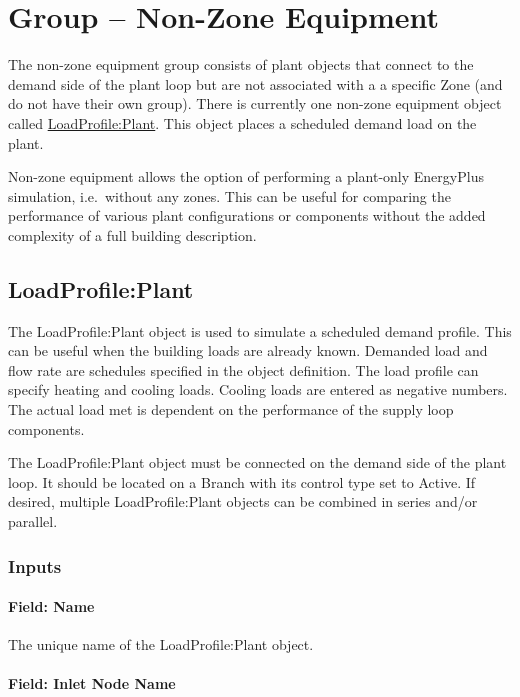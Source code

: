 \section{Group -- Non-Zone Equipment}\label{group-non-zone-equipment}

The non-zone equipment group consists of plant objects that connect to the demand side of the plant loop but are not associated with a a specific Zone (and do not have their own group). There is currently one non-zone equipment object called \hyperref[loadprofileplant]{LoadProfile:Plant}. This object places a scheduled demand load on the plant.

Non-zone equipment allows the option of performing a plant-only EnergyPlus simulation, i.e.~without any zones. This can be useful for comparing the performance of various plant configurations or components without the added complexity of a full building description.

\subsection{LoadProfile:Plant}\label{loadprofileplant}

The LoadProfile:Plant object is used to simulate a scheduled demand profile. This can be useful when the building loads are already known. Demanded load and flow rate are schedules specified in the object definition. The load profile can specify heating and cooling loads. Cooling loads are entered as negative numbers. The actual load met is dependent on the performance of the supply loop components.

The LoadProfile:Plant object must be connected on the demand side of the plant loop. It should be located on a Branch with its control type set to Active. If desired, multiple LoadProfile:Plant objects can be combined in series and/or parallel.

\subsubsection{Inputs}\label{inputs-028}

\paragraph{Field: Name}\label{field-name-027}

The unique name of the LoadProfile:Plant object.

\paragraph{Field: Inlet Node Name}\label{field-inlet-node-name-002}

